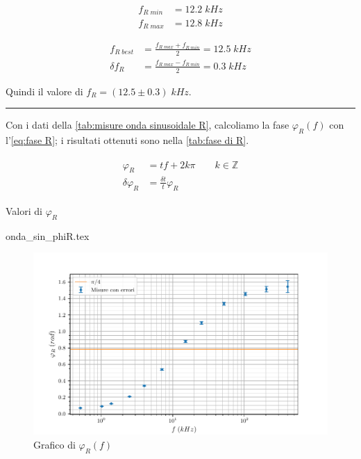 \documentclass[11pt, a4paper]{article}
\numberwithin{equation}{section} %
\begin{document}
\begin{align*}
    f_{R \; min} &= 12.2 \; kHz \\
    f_{R \; max} &= 12.8 \; kHz
\end{align*}

\begin{align*}
    f_{R \; best} &= \frac{f_{R \; max} + f_{R \; min}}{2} = 12.5  \; kHz \\
    \delta f_{R} &= \frac{f_{R \; max} - f_{R \; min}}{2} = 0.3 \; kHz
\end{align*}

Quindi il valore di \(f_{R} = (12.5 \pm 0.3) \; kHz\).

\rule{\textwidth}{1pt}

Con i dati della \autoref{tab:misure onda sinusoidale R}, calcoliamo la fase $\varphi_{R}(f)$ con l'\autoref{eq:fase R}; i risultati ottenuti sono nella \autoref{tab:fase di R}.

\begin{align} \label{eq:fase R}
    \begin{split}
        \varphi_{R} &= tf + 2k\pi \qquad k \in \mathbb{Z} \\
        \delta \varphi_{R} &= \frac{\delta t}{t} \varphi_{R}
    \end{split}
\end{align}

\begin{table}[ht!]
    \centering
    \caption{Valori di $\varphi_{R}$}
    {onda_sin_phiR.tex}
    \label{tab:fase di R}
\end{table}


\begin{figure}[ht!]
    \includegraphics{onda_sin_phi(f)_R.pdf}
    \caption{Grafico di $\varphi_{R}(f)$}
    \label{fig:fase R}
\end{figure}
\end{document}
